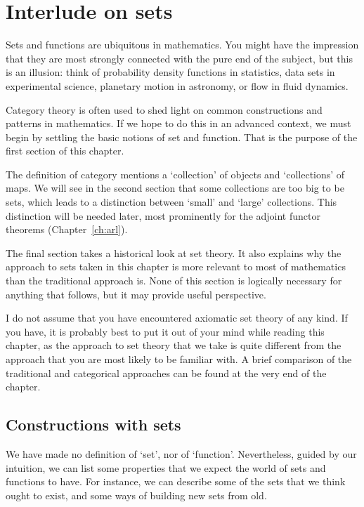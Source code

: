 %
%
%

\chapter{Interlude on sets}
\label{ch:sets}

Sets and functions are ubiquitous in mathematics.  You might have the
impression that they are most strongly connected with the pure end of the
subject, but this is an illusion: think of probability density functions in
statistics, data sets in experimental science, planetary motion in
astronomy, or flow in fluid dynamics.

Category theory is often used to shed light on common constructions and
patterns in mathematics.  If we hope to do this in an advanced context, we
must begin by settling the basic notions of set and function.  That is the
purpose of the first section of this chapter.

The definition of category mentions a `collection' of objects and
`collections' of maps.  We will see in the second section that some
collections are too big to be sets, which leads to a distinction between
`small' and `large' collections.  This distinction will be needed later,
most prominently for the adjoint functor theorems (Chapter~\ref{ch:arl}).

The final section takes a historical look at set theory.  It also explains
why the approach to sets taken in this chapter is more relevant to most of
mathematics than the traditional approach is.  None of this section is
logically necessary for anything that follows, but it may provide useful
perspective.

I do not assume that you have encountered axiomatic set theory of any kind.
If you have, it is probably best to put it out of your mind while reading
this chapter, as the approach to set theory that we take is quite different
from the approach that you are most likely to be familiar with.  A brief
comparison of the traditional and categorical approaches can be found at
the very end of the chapter.



\section{Constructions with sets}
\label{sec:Set-properties}


We have made no definition of `set', nor of `function'.  Nevertheless,
guided by our intuition, we can list some properties that we expect the
world of sets and functions to have.  For instance, we can describe some
of the sets that we think ought to exist, and some ways of building new
sets from old.

